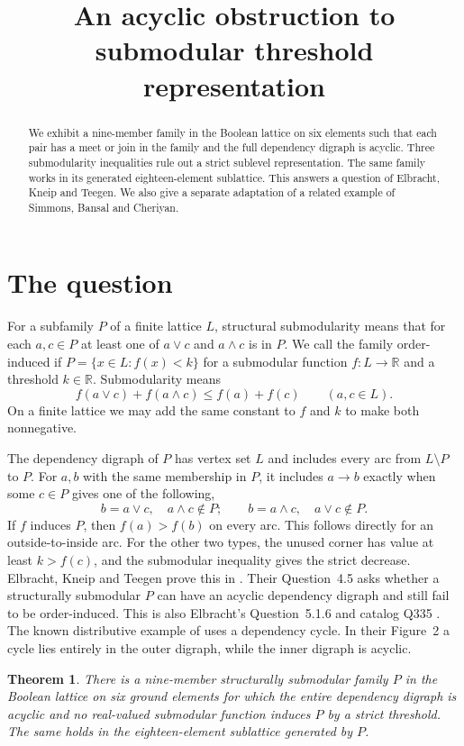 \documentclass[11pt,a4paper]{amsart}
\title{An acyclic obstruction to submodular threshold representation}
\date{}
\newtheorem{theorem}{Theorem}
\newcommand{\R}{\mathbb R}
\begin{document}
\begin{abstract}
We exhibit a nine-member family in the Boolean lattice on six elements
such that each pair has a meet or join in the family and the full
dependency digraph is acyclic. Three submodularity inequalities rule
out a strict sublevel representation. The same family works in its
generated eighteen-element sublattice. This answers a question of
Elbracht, Kneip and Teegen. We also give a separate adaptation of a
related example of Simmons, Bansal and Cheriyan.
\end{abstract}
\maketitle

\section{The question}

For a subfamily $P$ of a finite lattice $L$, structural submodularity
means that for each $a,c\in P$ at least one of $a\vee c$ and
$a\wedge c$ is in $P$. We call the family order-induced if
$P=\{x\in L:f(x)<k\}$ for a submodular function $f:L\to\R$
and a threshold $k\in\R$. Submodularity means
\[
 f(a\vee c)+f(a\wedge c)\le f(a)+f(c)\qquad(a,c\in L).
\]
On a finite lattice we may add the same constant to $f$ and $k$
to make both nonnegative.

The dependency digraph of $P$ has vertex set $L$ and includes
every arc from $L\setminus P$ to $P$. For $a,b$ with the same
membership in $P$, it includes $a\to b$ exactly when some
$c\in P$ gives one of the following,
\[
 b=a\vee c,\quad a\wedge c\notin P;\qquad
 b=a\wedge c,\quad a\vee c\notin P.
\]
If $f$ induces $P$, then $f(a)>f(b)$ on every arc. This follows
directly for an outside-to-inside arc. For the other two
types, the unused corner has value at least $k>f(c)$, and
the submodular inequality gives the strict decrease.
Elbracht, Kneip and Teegen prove this in \cite[Lemma~4.1]{ekt}.
Their Question~4.5 asks whether a structurally submodular $P$
can have an acyclic dependency digraph and still fail to be
order-induced. This is also Elbracht's
Question~5.1.6 \cite[p.~199]{elbracht} and catalog Q335 \cite{catalog}.
The known distributive example of \cite[Theorem~4.3]{ekt} uses
a dependency cycle. In their Figure~2 a cycle lies entirely in
the outer digraph, while the inner digraph is acyclic.

\begin{theorem}\label{thm:main}
There is a nine-member structurally submodular family $P$ in
the Boolean lattice on six ground elements for which the entire
dependency digraph is acyclic and no real-valued submodular function
induces $P$ by a strict threshold. The same holds in the
eighteen-element sublattice generated by $P$.
\end{theorem}
\end{document}

